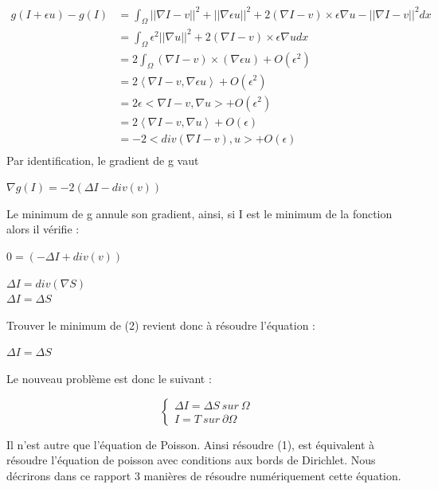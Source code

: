 \begin{equation*} 
\left.
\begin{aligned}
    g(I+\epsilon u) -g(I) &=  \int_\Omega || \nabla I - v||^2+ ||\nabla \epsilon u||^2 +2(\nabla I - v)\times \epsilon \nabla u  - ||\nabla I -v ||^2 dx\\
  &=  \int_\Omega \epsilon ^2||\nabla u||^2 +2(\nabla I - v)\times \epsilon \nabla u dx\\
    & = 2\int_\Omega (\nabla I - v) \times (\nabla \epsilon u ) + O (\epsilon^2) \\ 
    & = 2\left<\nabla I - v, \nabla \epsilon u \right> + O (\epsilon^2) \\ 
      &  =   2\epsilon<\nabla I - v,  \nabla u> + O (\epsilon^2) \\ 
         &  = 2\left<\nabla I - v,  \nabla u \right> + O (\epsilon)\\ 
    & =  -2 <div(\nabla I - v), u > + O (\epsilon)\\
\end{aligned}
\right.
\end{equation*}
Par identification, le gradient de g vaut 
\begin{center}
		$\nabla g(I) = -2(\Delta I-div( v))$
\end{center} 
Le minimum de g annule son gradient, ainsi, si I est le minimum de la fonction alors il vérifie :\begin{center}
		$0= (-\Delta I+div(v))$
\end{center}
\begin{center}
		$\Delta I =div(\nabla S)$\\
		$\Delta I = \Delta S$
		
\end{center} 

Trouver le minimum de (2) revient donc à résoudre l'équation : 
\begin{center}
$\Delta I = \Delta S$
\end{center}
Le nouveau problème est donc le suivant : 
\begin{center}
    \begin{equation}
        \left\{
        \begin{aligned}
         \Delta I = \Delta S  \ sur \  \Omega \\
          I = T \ sur \  \partial \Omega
        \end{aligned}
        \right.
    \end{equation}
\end{center}
Il n'est autre que l'équation de Poisson. Ainsi résoudre (1), est équivalent à résoudre l'équation de poisson avec conditions aux bords de Dirichlet. Nous décrirons dans ce rapport 3 manières de résoudre numériquement cette équation. 


